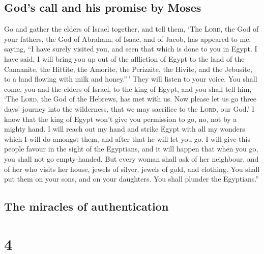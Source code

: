 \hypertarget{gods-call-and-his-promise-by-moses}{%
\subsection{God's call and his promise by
Moses}\label{gods-call-and-his-promise-by-moses}}

 Go and gather the elders of Israel together, and tell
them, `The \textsc{Lord}, the God of your fathers, the God of Abraham,
of Isaac, and of Jacob, has appeared to me, saying, ``I have surely
visited you, and seen that which is done to you in Egypt.
 I have said, I will bring you up out of the affliction
of Egypt to the land of the Canaanite, the Hittite, the Amorite, the
Perizzite, the Hivite, and the Jebusite, to a land flowing with milk and
honey.''\,'  They will listen to your voice. You shall
come, you and the elders of Israel, to the king of Egypt, and you shall
tell him, `The \textsc{Lord}, the God of the Hebrews, has met with us.
Now please let us go three days' journey into the wilderness, that we
may sacrifice to the \textsc{Lord}, our God.'  I know
that the king of Egypt won't give you permission to go, no, not by a
mighty hand.  I will reach out my hand and strike Egypt
with all my wonders which I will do amongst them, and after that he will
let you go.  I will give this people favour in the sight
of the Egyptians, and it will happen that when you go, you shall not go
empty-handed.  But every woman shall ask of her
neighbour, and of her who visits her house, jewels of silver, jewels of
gold, and clothing. You shall put them on your sons, and on your
daughters. You shall plunder the Egyptians.''

\hypertarget{the-miracles-of-authentication}{%
\subsection{The miracles of
authentication}\label{the-miracles-of-authentication}}

\hypertarget{section-3}{%
\section{4}\label{section-3}}

